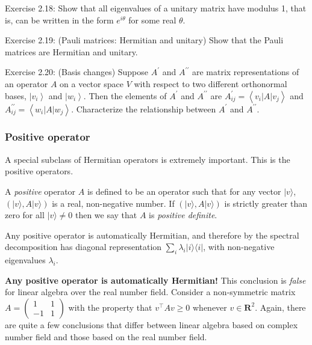 \begin{exercise}
    Exercise 2.18: Show that all eigenvalues of a unitary matrix have modulus 1, that is, can be written in the form $e^{i \theta}$ for some real $\theta$.
\end{exercise}

\begin{exercise}
    Exercise 2.19: (Pauli matrices: Hermitian and unitary) Show that the Pauli matrices are Hermitian and unitary.
\end{exercise}

\begin{exercise}
    Exercise 2.20: (Basis changes) Suppose $A^{\prime}$ and $A^{\prime \prime}$ are matrix representations of an operator $A$ on a vector space $V$ with respect to two different orthonormal bases, $\left|v_{i}\right\rangle$ and $\left|w_{i}\right\rangle$. Then the elements of $A^{\prime}$ and $A^{\prime \prime}$ are $A_{i j}^{\prime}=\left\langle v_{i}|A| v_{j}\right\rangle$ and $A_{i j}^{\prime \prime}=\left\langle w_{i}|A| w_{j}\right\rangle$. Characterize the relationship between $A^{\prime}$ and $A^{\prime \prime}$.
\end{exercise}

\subsubsection{Positive operator}

A special subclass of Hermitian operators is extremely important. This is the positive operators. 

A \textit{positive} operator $A$ is defined to be an operator such that for any vector $|v\rangle$, $(|v\rangle, A|v\rangle)$ is a real, non-negative number. If $(|v\rangle, A|v\rangle)$ is strictly greater than zero for all $|v\rangle \neq 0$ then we say that $A$ is \textit{positive definite}. 

Any positive operator is automatically Hermitian, and therefore by the spectral decomposition has diagonal representation $\sum_{i} \lambda_{i}|i\rangle\langle i|$, with non-negative eigenvalues $\lambda_{i}$.

\begin{remark}
    \textbf{Any positive operator is automatically Hermitian!} This conclusion is \textit{false} for linear algebra over the real number field. Consider a non-symmetric matrix $A=\left(\begin{array}{cc}
1 & 1 \\
-1 & 1
\end{array}\right)$ with the property that $v^{\top} A v \geq 0$ whenever $v \in \mathbf{R}^2.$ Again, there are quite a few conclusions that differ between linear algebra based on complex number field and those based on the real number field.
\end{remark}

